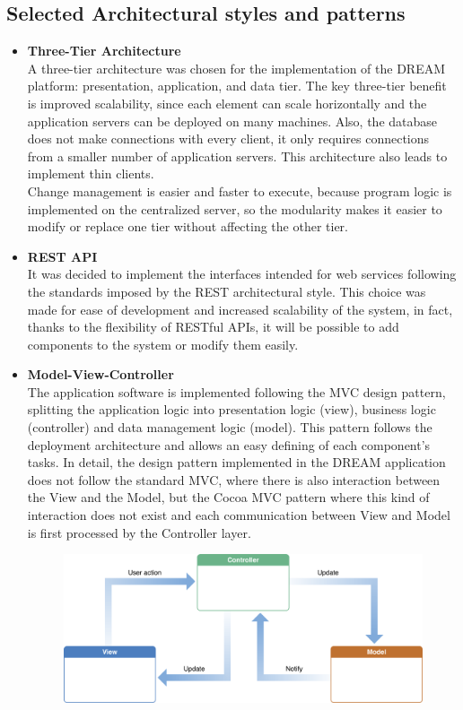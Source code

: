 \documentclass[10pt]{article} %
\begin{document}
\subsection{Selected Architectural styles and patterns}
\begin{itemize}
    \item \textbf{Three-Tier Architecture}\\A three-tier architecture was chosen for the 
    implementation of the DREAM platform: presentation, application, and data tier. 
    The key three-tier benefit is improved scalability, since each element
    can scale horizontally and the application servers can be deployed on many machines. 
    Also, the database does not make connections with every client, it only requires 
    connections from a smaller number of application servers. This architecture also leads to 
    implement thin clients. \\
    Change management is easier and faster to execute, because program logic
     is implemented on the centralized server, so the modularity makes it easier to modify 
     or replace one tier without affecting the other tier.
    \item \textbf{REST API}\\It was decided to implement the interfaces intended for web services 
    following the standards imposed by the REST architectural style. This choice was made for ease 
    of development and increased scalability of the system, in fact, thanks to the flexibility of 
    RESTful APIs, it will be possible to add components to the system or modify them easily.  
    \item \textbf{Model-View-Controller}\\
    The application software is implemented following the MVC design pattern, splitting the application logic into presentation logic (view),
    business logic (controller) and data management logic (model). This pattern follows the deployment architecture and allows an easy defining
    of each component's tasks. In detail, the design pattern implemented in the DREAM application does not follow the standard MVC, where there is also 
    interaction between the View and the Model, but the Cocoa MVC pattern where this kind of interaction does not exist and each communication between View and Model
    is first processed by the Controller layer.
    \begin{figure}[h]
        \centering
        \includegraphics[scale=0.23]{images/cocoamvc.png}

\end{figure}
\end{itemize}
\end{document}
